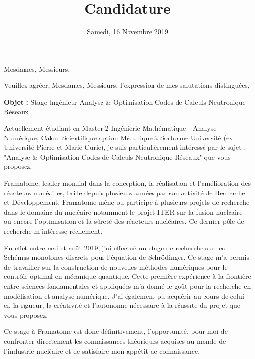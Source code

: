 \documentclass[11pt,a4paper,sans]{moderncv}        %
\title{Candidature}                               %
\begin{document}
\date{Samedi, 16 Novembre 2019}
\opening{Mesdames, Messieurs,}
\closing{Veuillez agréer, Mesdames, Messieurs, l’expression de mes salutations distinguées,}
\makelettertitle

\textbf{Objet :} Stage Ingénieur Analyse \& Optimisation Codes de Calculs Neutronique-Réseaux

Actuellement étudiant en Master 2 Ingénierie Mathématique - Analyse Numérique, Calcul Scientifique option Mécanique à Sorbonne Université (ex Université Pierre et Marie Curie), je suis particulièrement intéressé par le sujet : "Analyse \& Optimisation Codes de Calculs Neutronique-Réseaux" que vous proposez.

Framatome, leader mondial dans la conception, la réalisation et l'amélioration des réacteurs nucléaires, brille depuis plusieurs années par son activité de Recherche et Développement. Framatome mène ou participe à plusieurs projets de recherche dans le domaine du nucléaire notamment le projet ITER sur la fusion nucléaire ou encore l’optimisation et la sûreté des réacteurs nucléaires. Ce dernier pôle de recherche m'intéresse réellement.

En effet entre mai et août 2019, j’ai effectué un stage de recherche sur les Schémas monotones discrets pour l'équation de Schrödinger. Ce stage m'a permis de travailler sur la construction de nouvelles méthodes numériques pour le contrôle optimal en mécanique quantique. Cette première expérience à la frontière entre sciences fondamentales et appliquées m’a donné le goût pour la recherche en modélisation et analyse numérique.
J’ai également pu acquérir au cours de celui-ci, la rigueur, la créativité et l’autonomie nécessaire à la réussite du projet que vous proposez.

Ce stage à Framatome est donc définitivement, l'opportunité, pour moi de confronter directement les connaissances théoriques acquises au monde de l’industrie nucléaire et de satisfaire mon appétit de connaissance.





\makeletterclosing
\end{document}
